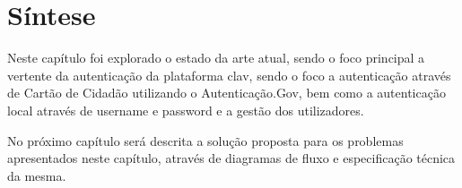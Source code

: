 \section{Síntese}

Neste capítulo foi explorado o estado da arte atual, sendo o foco principal a vertente da autenticação da plataforma \gls{clav}, sendo o foco a autenticação através de Cartão de Cidadão utilizando o Autenticação.Gov, bem como a autenticação local através de username e password e a gestão dos utilizadores.

No próximo capítulo será descrita a solução proposta para os problemas apresentados neste capítulo, através de diagramas de fluxo e especificação técnica da mesma. 